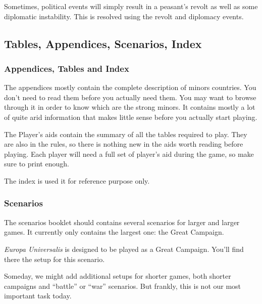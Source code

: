 Sometimes, political events will simply result in a peasant's revolt as well
as some diplomatic instability. This is resolved using the revolt and
diplomacy events.

\subsection*{Tables, Appendices, Scenarios, Index}
\subsubsection*{Appendices, Tables and Index}
The appendices mostly contain the complete description of minors
countries. You don't need to read them before you actually need them. You may
want to browse through it in order to know which are the strong minors. It
contains mostly a lot of quite arid information that makes little sense before
you actually start playing.

The Player's aids contain the summary of all the tables required to play. They
are also in the rules, so there is nothing new in the aids worth reading
before playing. Each player will need a full set of player's aid during the
game, so make sure to print enough.

The index is used it for reference purpose only.

\subsubsection*{Scenarios}
The scenarios booklet should contains several scenarios for larger and larger
games. It currently only contains the largest one: the Great Campaign.

\emph{Europa Universalis} is designed to be played as a Great Campaign. You'll
find there the setup for this scenario.

Someday, we might add additional setups for shorter games, both shorter
campaigns and ``battle'' or ``war'' scenarios. But frankly, this is not our
most important task today.

